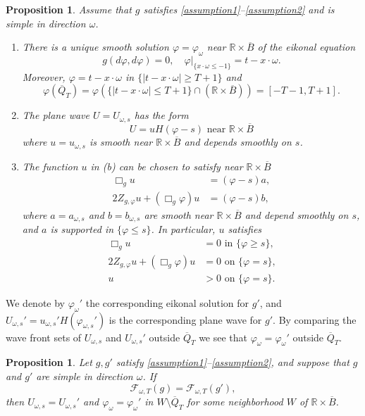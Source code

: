 \documentclass[11pt,letterpaper]{amsart}
\newtheorem{Proposition}[Theorem]{Proposition}
\theoremstyle{definition}
\numberwithin{equation}{section}
\newcommand{\mR}{\mathbb{R}}                    %
\newcommand{\ol}[1]{\overline{#1}}
\begin{document}
\begin{Proposition} \label{prop_plane_wave_structure}
Assume that $g$ satisfies \eqref{assumption1}--\eqref{assumption2} and is simple in direction $\omega$.

\begin{enumerate}
\item[(a)] 
There is a unique smooth solution $\varphi = \varphi_{\omega}$ near $\mR \times \ol{B}$ of the eikonal equation 
\[
\text{$g(d\varphi, d\varphi) = 0$}, \quad  \varphi|_{\{x \cdot \omega \leq -1\}} = t - x \cdot \omega.
\]
Moreover, $\varphi = t - x \cdot \omega$ in $\{ |t - x \cdot \omega| \geq T+1 \}$ and 
\[
\varphi(\ol{Q}_T) = \varphi(\{ |t - x \cdot \omega| \leq T+1 \} \cap (\mR \times \ol{B})) = [-T-1, T+1].
\]

\item[(b)] 
The plane wave $U = U_{\omega,s}$ has the form 
\[
U = u H(\varphi - s) \text{ near $\mR \times \ol{B}$}
\]
where $u = u_{\omega,s}$ is smooth near $\mR \times \ol{B}$ and depends smoothly on $s$.

\item[(c)]
The function $u$ in {\rm (b)} can be chosen to satisfy near $\mR \times \ol{B}$ 
\begin{align*}
\Box_g u &= (\varphi-s) a, \\
2 Z_{g,\varphi} u + (\Box_g \varphi) u &= (\varphi-s) b,
\end{align*}
where $a = a_{\omega,s}$ and $b = b_{\omega,s}$ are smooth near $\mR \times \ol{B}$ and depend smoothly on $s$, and $a$ is supported in $\{ \varphi \leq s \}$. In particular, $u$ satisfies 
\begin{align*}
\Box_g u &= 0 \text{ in $\{ \varphi \geq s \}$}, \\
2 Z_{g,\varphi} u + (\Box_g \varphi) u &= 0 \text{ on $\{ \varphi = s \}$,} \\
u &> 0 \text{ on $\{ \varphi = s \}$.}
\end{align*}
\end{enumerate}
\end{Proposition}

We denote by $\varphi_{\omega}'$ the corresponding eikonal solution for $g'$, and $U_{\omega,s}' = u_{\omega,s}' H(\varphi_{\omega,s}')$ is the corresponding plane wave for $g'$. By comparing the wave front sets of $U_{\omega,s}$ and $U_{\omega,s}'$ outside $\ol{Q}_T$ we see that $\varphi_{\omega} = \varphi_{\omega}'$ outside $\ol{Q}_T$.

\begin{Proposition} \label{prop_eikonal_detection}
Let $g, g'$ satisfy \eqref{assumption1}--\eqref{assumption2}, and suppose that $g$ and $g'$ are simple in direction $\omega$. If 
\[
\mathcal{F}_{\omega,T}(g) = \mathcal{F}_{\omega,T}(g'),
\]
then $U_{\omega,s} = U_{\omega,s}'$ and $\varphi_{\omega}  = \varphi_{\omega}'$ in $W \setminus \ol{Q}_T$ for some neighborhood $W$ of $\mR \times \ol{B}$.
\end{Proposition}
\end{document}
